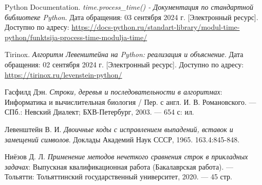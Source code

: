 \renewcommand{\refname}{Список использованных источников}

\begin{thebibliography}{9}
     Python Documentation. \textit{time.process\_time() - Документация по стандартной библиотеке Python}. Дата обращения: 03 сентября 2024 г. [Электронный ресурс]. Доступно по адресу: \url{https://docs-python.ru/standart-library/modul-time-python/funktsija-process-time-modulja-time/}
    
     Tirinox. \textit{Алгоритм Левенштейна на Python: реализация и объяснение}. Дата обращения: 02 сентября 2024 г. [Электронный ресурс]. Доступно по адресу: \url{https://tirinox.ru/levenstein-python/}
    
     Гасфилд Дэн. \textit{Строки, деревья и последовательности в алгоритмах}: Информатика и вычислительная биология / Пер. с англ. И. В. Романовского. — СПб.: Невский Диалект; БХВ-Петербург, 2003. — 654 с: ил.
    
     Левенштейн В. И. \textit{Двоичные коды с исправлением выпадений, вставок и замещений символов}. Доклады Академий Наук СССР, 1965. 163.4:845-848.
    
     Ниёзов Д. Л. \textit{Применение методов нечеткого сравнения строк в прикладных задачах}: Выпускная квалификационная работа (Бакалаврская работа). — Тольятти: Тольяттинский государственный университет, 2020. — 45 стр.
    
\end{thebibliography}